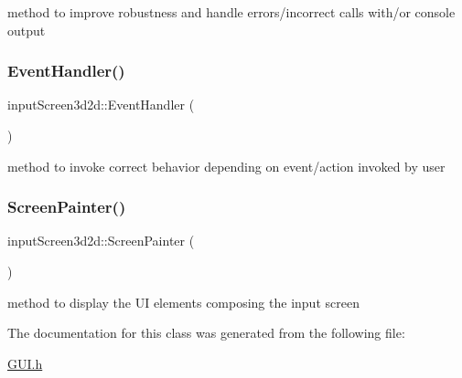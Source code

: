 method to improve robustness and handle errors/incorrect calls with/or console output \mbox{\label{classinput_screen3d2d_a0f023449b6fe3d8b7b981767976129de}} 
\subsubsection{\texorpdfstring{Event\+Handler()}{EventHandler()}}
{\footnotesize\ttfamily input\+Screen3d2d\+::\+Event\+Handler (\begin{DoxyParamCaption}{ }\end{DoxyParamCaption})}

method to invoke correct behavior depending on event/action invoked by user \mbox{\label{classinput_screen3d2d_af0c3df669aff35608d38fd4ef30e31bb}} 
\subsubsection{\texorpdfstring{Screen\+Painter()}{ScreenPainter()}}
{\footnotesize\ttfamily input\+Screen3d2d\+::\+Screen\+Painter (\begin{DoxyParamCaption}{ }\end{DoxyParamCaption})}

method to display the UI elements composing the input screen 

The documentation for this class was generated from the following file\+:\begin{DoxyCompactItemize}
\item 
\mbox{\hyperlink{_g_u_i_8h}{G\+U\+I.\+h}}\end{DoxyCompactItemize}
